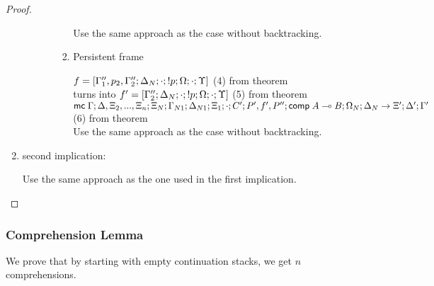 \begin{proof}
\begin{enumerate}
\begin{itemize}
\begin{enumerate}
\begin{enumerate}
               Use the same approach as the case without backtracking.
               
               
               \item Persistent frame
               
               $f = [\Gamma''_1, p_2, \Gamma''_2; \Delta_N; \cdot; {!} p; \Omega; \cdot; \Upsilon]$ \hfill (4) from theorem \\
               turns into $f' = [\Gamma''_2; \Delta_N; \cdot; {!} p; \Omega; \cdot; \Upsilon]$ \hfill (5) from theorem \\
               $\mathsf{mc} \; \Gamma; \Delta, \Xi_2, ..., \Xi_n; \Xi_N; \Gamma_{N1}; \Delta_{N1}; \Xi_1; \cdot; C'; P', f', P''; \mathsf{comp} \; A \multimap B; \Omega_N; \Delta_N \rightarrow \Xi'; \Delta'; \Gamma'$ \hfill (6) from theorem \\
               
               Use the same approach as the case without backtracking.
            \end{enumerate}
         \end{enumerate}
      \end{itemize}
      
      \item second implication:
      
      Use the same approach as the one used in the first implication.
   \end{enumerate}
\end{proof}

\subsubsection{Comprehension Lemma}

We prove that by starting with empty continuation stacks, we get $n$ comprehensions.

